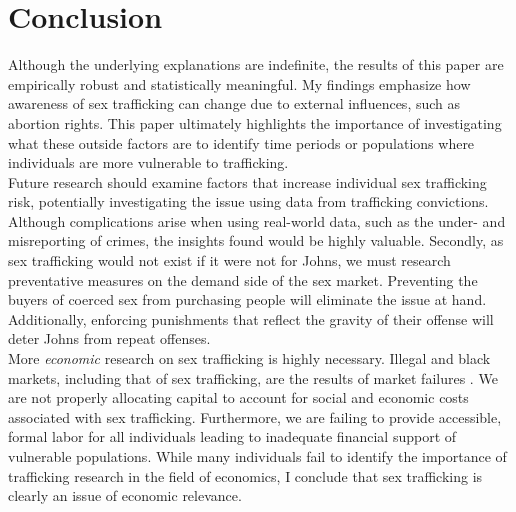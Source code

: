 \section{Conclusion}
Although the underlying explanations are indefinite, the results of this paper are empirically robust and statistically meaningful. My findings emphasize how awareness of sex trafficking can change due to external influences, such as abortion rights. This paper ultimately highlights the importance of investigating what these outside factors are to identify time periods or populations where individuals are more vulnerable to trafficking. \\
\indent Future research should examine factors that increase individual sex trafficking risk, potentially investigating the issue using data from trafficking convictions. Although complications arise when using real-world data, such as the under- and misreporting of crimes, the insights found would be highly valuable. Secondly, as sex trafficking would not exist if it were not for Johns, we must research preventative measures on the demand side of the sex market. Preventing the buyers of coerced sex from purchasing people will eliminate the issue at hand. Additionally, enforcing punishments that reflect the gravity of their offense will deter Johns from repeat offenses. \\
\indent More \textit{economic} research on sex trafficking is highly necessary. Illegal and black markets, including that of sex trafficking, are the results of market failures \citep{undp_fast_2025}. We are not properly allocating capital to account for social and economic costs associated with sex trafficking. Furthermore, we are failing to provide accessible, formal labor for all individuals leading to inadequate financial support of vulnerable populations. While many individuals fail to identify the importance of trafficking research in the field of economics, I conclude that sex trafficking is clearly an issue of economic relevance. \\



